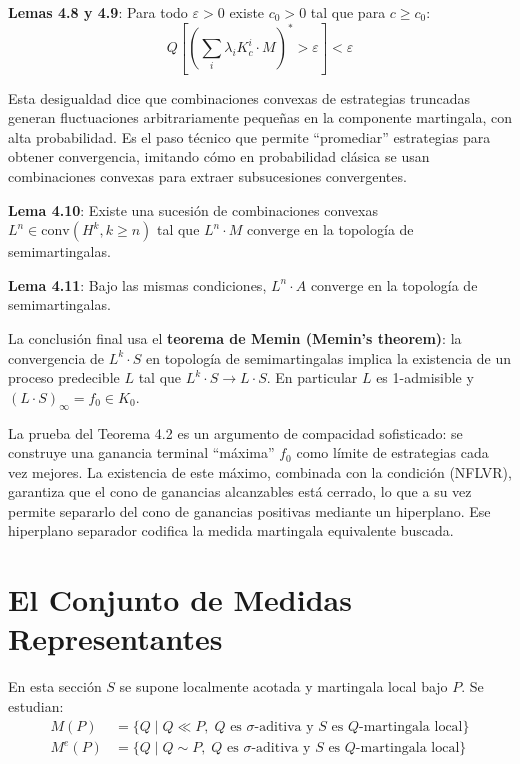 \documentclass[12pt]{article}
\begin{document}
\textbf{Lemas 4.8 y 4.9}: Para todo $\varepsilon > 0$ existe $c_0 > 0$ tal que para $c \geq c_0$:
\begin{equation}
    Q\left[\left(\sum_i \lambda_i K^i_c \cdot M\right)^* > \varepsilon\right] < \varepsilon
\end{equation}

\begin{intuicionmat}
Esta desigualdad dice que combinaciones convexas de estrategias truncadas generan fluctuaciones arbitrariamente peque\~nas en la componente martingala, con alta probabilidad. Es el paso t\'ecnico que permite ``promediar'' estrategias para obtener convergencia, imitando c\'omo en probabilidad cl\'asica se usan combinaciones convexas para extraer subsucesiones convergentes.
\end{intuicionmat}

\textbf{Lema 4.10}: Existe una sucesi\'on de combinaciones convexas $L^n \in \text{conv}(H^k, k \geq n)$ tal que $L^n \cdot M$ converge en la topolog\'ia de semimartingalas.

\textbf{Lema 4.11}: Bajo las mismas condiciones, $L^n \cdot A$ converge en la topolog\'ia de semimartingalas.

La conclusi\'on final usa el \textbf{teorema de Memin (Memin's theorem)}: la convergencia de $L^k \cdot S$ en topolog\'ia de semimartingalas implica la existencia de un proceso predecible $L$ tal que $L^k \cdot S \to L \cdot S$. En particular $L$ es 1-admisible y $(L \cdot S)_\infty = f_0 \in K_0$.

\begin{intuicion}
La prueba del Teorema 4.2 es un argumento de compacidad sofisticado: se construye una ganancia terminal ``m\'axima'' $f_0$ como l\'imite de estrategias cada vez mejores. La existencia de este m\'aximo, combinada con la condici\'on (NFLVR), garantiza que el cono de ganancias alcanzables est\'a cerrado, lo que a su vez permite separarlo del cono de ganancias positivas mediante un hiperplano. Ese hiperplano separador codifica la medida martingala equivalente buscada.
\end{intuicion}

\section{El Conjunto de Medidas Representantes}

En esta secci\'on $S$ se supone localmente acotada y martingala local bajo $P$. Se estudian:
\begin{align}
    M(P) &= \{Q \mid Q \ll P,\; Q \text{ es } \sigma\text{-aditiva y } S \text{ es } Q\text{-martingala local}\} \\
    M^e(P) &= \{Q \mid Q \sim P,\; Q \text{ es } \sigma\text{-aditiva y } S \text{ es } Q\text{-martingala local}\}
\end{align}
\end{document}
